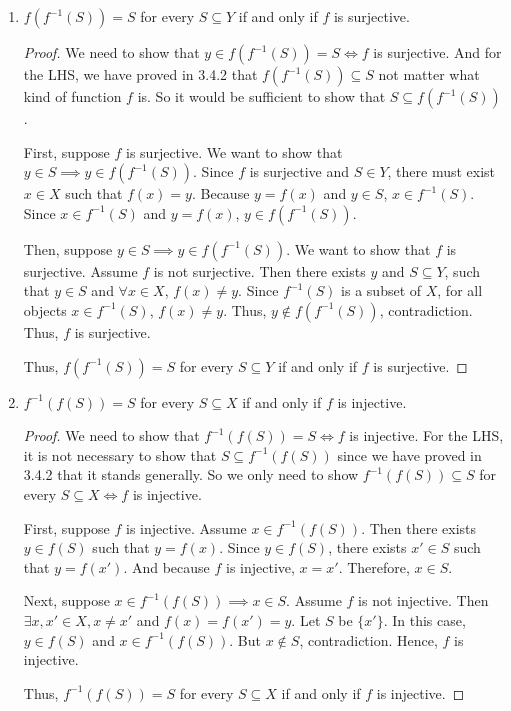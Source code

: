 \documentclass[12pt, letter]{article}
\begin{document}
\begin{enumerate}
    \item $f(f^{-1}(S))=S$ for every $S\subseteq Y$ if and only if $f$ is surjective. 
    \begin{proof}
        We need to show that $y\in f(f^{-1}(S))=S\iff f$ is surjective. And for the LHS, we have proved in 3.4.2 that $f(f^{-1}(S))\subseteq S$ not matter what kind of function $f$ is. So it would be sufficient to show that $S\subseteq f(f^{-1}(S))$. 
        
        First, suppose $f$ is surjective. We want to show that $y\in S\implies y\in f(f^{-1}(S))$. Since $f$ is surjective and $S\in Y$, there must exist $x\in X$ such that $f(x)=y$. Because $y=f(x)$ and $y\in S$, $x\in f^{-1}(S)$. Since $x\in f^{-1}(S)$ 
        and $y=f(x)$, $y\in f(f^{-1}(S))$. 

        Then, suppose $y\in S\implies y\in f(f^{-1}(S))$. We want to show that $f$ is surjective. Assume $f$ is not surjective. Then there exists $y$ and $S\subseteq Y$, such that $y\in S$ and $\forall x\in X$, $f(x)\ne y$. Since $f^{-1}(S)$ is a subset of $X$, 
        for all objects $x\in f^{-1}(S)$, $f(x)\ne y$. Thus, $y\notin f(f^{-1}(S))$, contradiction. Thus, $f$ is surjective.
        
        Thus, $f(f^{-1}(S))=S$ for every $S\subseteq Y$ if and only if $f$ is surjective. 
    \end{proof}
    \item $f^{-1}(f(S))=S$ for every $S\subseteq X$ if and only if $f$ is injective.
    \begin{proof}
        We need to show that $f^{-1}(f(S))=S\iff f$ is injective. For the LHS, it is not necessary to show that $S\subseteq f^{-1}(f(S))$ since we have proved in 3.4.2 that it stands generally. 
        So we only need to show $f^{-1}(f(S))\subseteq S$ for every $S\subseteq X\iff f$ is injective.
        
        First, suppose $f$ is injective. Assume $x\in f^{-1}(f(S))$. Then there exists $y\in f(S)$ such that $y=f(x)$. Since $y\in f(S)$, there exists $x'\in S$ such that $y=f(x')$. 
        And because $f$ is injective, $x=x'$. Therefore, $x\in S$.

        Next, suppose $x\in f^{-1}(f(S))\implies x\in S$. Assume $f$ is not injective. Then $\exists x,x'\in X, x\ne x'$ and $f(x)=f(x')=y$. 
        Let $S$ be $\{x'\}$. In this case, $y\in f(S)$ and $x\in f^{-1}(f(S))$. But $x\notin S$, contradiction. Hence, $f$ is injective.

        Thus, $f^{-1}(f(S))=S$ for every $S\subseteq X$ if and only if $f$ is injective. 
    \end{proof}
\end{enumerate}
\end{document}
